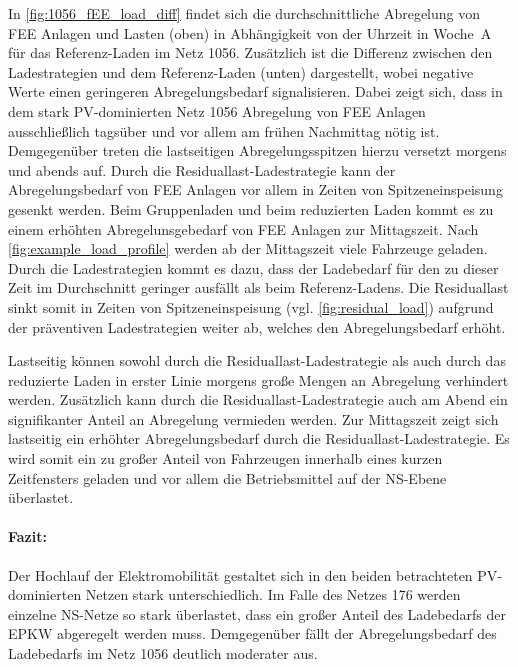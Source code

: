 

In \autoref{fig:1056_fEE_load_diff} findet sich die durchschnittliche Abregelung von \gls{FEE} Anlagen und Lasten (oben) in Abhängigkeit von der Uhrzeit in Woche~A für das Referenz-Laden im Netz \num{1056}.
Zusätzlich ist die Differenz zwischen den Ladestrategien und dem Referenz-Laden (unten) dargestellt, wobei negative Werte einen geringeren Abregelungsbedarf signalisieren.
Dabei zeigt sich, dass in dem stark \gls{PV}-dominierten Netz \num{1056} Abregelung von \gls{FEE} Anlagen ausschließlich tagsüber und vor allem am frühen Nachmittag nötig ist.
Demgegenüber treten die lastseitigen Abregelungsspitzen hierzu versetzt morgens und abends auf.
Durch die Residuallast-Ladestrategie kann der Abregelungsbedarf von \gls{FEE} Anlagen vor allem in Zeiten von Spitzeneinspeisung gesenkt werden.
Beim Gruppenladen und beim reduzierten Laden kommt es zu einem erhöhten Abregelunsgebedarf von \gls{FEE} Anlagen zur Mittagszeit.
Nach \autoref{fig:example_load_profile} werden ab der Mittagszeit viele Fahrzeuge \zH geladen.
Durch die Ladestrategien kommt es dazu, dass der Ladebedarf für den \UC \zH zu dieser Zeit im Durchschnitt geringer ausfällt als beim Referenz-Ladens.
Die Residuallast sinkt somit in Zeiten von Spitzeneinspeisung (vgl. \autoref{fig:residual_load}) aufgrund der präventiven Ladestrategien weiter ab, welches den Abregelungsbedarf erhöht.




Lastseitig können sowohl durch die Residuallast-Ladestrategie als auch durch das reduzierte Laden in erster Linie morgens große Mengen an Abregelung verhindert werden.
Zusätzlich kann durch die Residuallast-Ladestrategie auch am Abend ein signifikanter Anteil an Abregelung vermieden werden.
Zur Mittagszeit zeigt sich lastseitig ein erhöhter Abregelungsbedarf durch die Residuallast-Ladestrategie.
Es wird somit ein zu großer Anteil von Fahrzeugen innerhalb eines kurzen Zeitfensters geladen und vor allem die Betriebsmittel auf der \gls{NS}-Ebene überlastet.


\paragraph{Fazit:}

Der Hochlauf der Elektromobilität gestaltet sich in den beiden betrachteten \gls{PV}-dominierten Netzen stark unterschiedlich.
Im Falle des Netzes \num{176} werden einzelne \gls{NS}-Netze so stark überlastet, dass ein großer Anteil des Ladebedarfs der \gls{EPKW} abgeregelt werden muss.
Demgegenüber fällt der Abregelungsbedarf des Ladebedarfs im Netz \num{1056} deutlich moderater aus. \medskip


